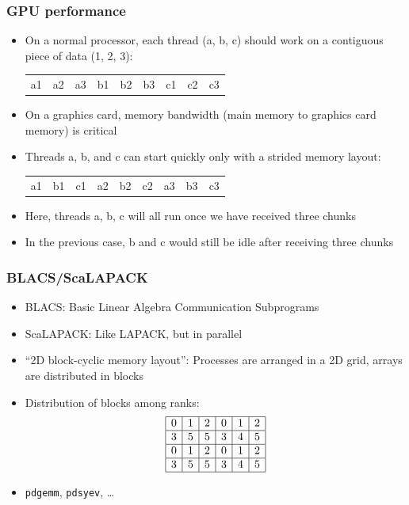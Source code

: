 \documentclass[usenames,dvipsnames,mathserif,compress]{beamer}
\begin{document}
\begin{frame}
  \frametitle{GPU performance}
  \begin{itemize}
  \item On a normal processor, each thread (a, b, c) should work on a contiguous piece of data (1, 2, 3):
    \begin{table}
    \begin{tabular}{|ccc|ccc|ccc|}
      a1 &a2 &a3 &b1 &b2 &b3 &c1 &c2 &c3
    \end{tabular}
    \end{table}
  \item On a graphics card, memory bandwidth (main memory to graphics card memory) is critical
  \item Threads a, b, and c can start quickly only with a \alert{strided} memory layout:
    \begin{table}
    \begin{tabular}{|c|c|c|c|c|c|c|c|c|}
      a1 &b1 &c1 &a2 &b2 &c2 &a3 &b3 &c3
    \end{tabular}
    \end{table}
  \item Here, threads a, b, c will all run once we have received three chunks
  \item In the previous case, b and c would still be idle after receiving three chunks
  \end{itemize}
\end{frame}

\begin{frame}
  \frametitle{BLACS/ScaLAPACK}
  \begin{itemize}
  \item BLACS: Basic Linear Algebra Communication Subprograms
  \item ScaLAPACK: Like LAPACK, but in parallel
  \item ``2D block-cyclic memory layout'': Processes are arranged in a 2D grid, arrays are distributed in blocks
  \item Distribution of blocks among ranks:
    \begin{align}
      \begin{array}{|c|c|c|c|c|c|}
        \hline
          0 & 1 & 2 & 0 & 1 & 2\\\hline
          3 & 5 & 5 & 3 & 4 & 5\\\hline
          0 & 1 & 2 & 0 & 1 & 2\\\hline
          3 & 5 & 5 & 3 & 4 & 5\\\hline
        \end{array}\nonumber
    \end{align}
  \item \texttt{pdgemm}, \texttt{pdsyev}, \ldots
  \end{itemize}
\end{frame}
\end{document}
